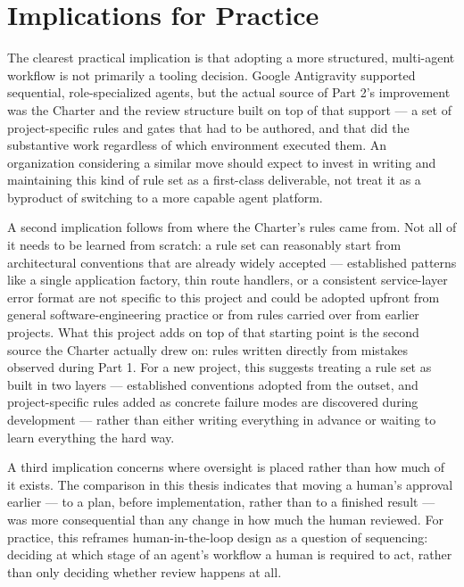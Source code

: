 \section{Implications for Practice}

The clearest practical implication is that adopting a more structured, multi-agent workflow is not primarily a tooling decision. Google Antigravity supported sequential, role-specialized agents, but the actual source of Part 2's improvement was the Charter and the review structure built on top of that support --- a set of project-specific rules and gates that had to be authored, and that did the substantive work regardless of which environment executed them. An organization considering a similar move should expect to invest in writing and maintaining this kind of rule set as a first-class deliverable, not treat it as a byproduct of switching to a more capable agent platform.

A second implication follows from where the Charter's rules came from. Not all of it needs to be learned from scratch: a rule set can reasonably start from architectural conventions that are already widely accepted --- established patterns like a single application factory, thin route handlers, or a consistent service-layer error format are not specific to this project and could be adopted upfront from general software-engineering practice or from rules carried over from earlier projects. What this project adds on top of that starting point is the second source the Charter actually drew on: rules written directly from mistakes observed during Part 1. For a new project, this suggests treating a rule set as built in two layers --- established conventions adopted from the outset, and project-specific rules added as concrete failure modes are discovered during development --- rather than either writing everything in advance or waiting to learn everything the hard way.

A third implication concerns where oversight is placed rather than how much of it exists. The comparison in this thesis indicates that moving a human's approval earlier --- to a plan, before implementation, rather than to a finished result --- was more consequential than any change in how much the human reviewed. For practice, this reframes human-in-the-loop design as a question of sequencing: deciding at which stage of an agent's workflow a human is required to act, rather than only deciding whether review happens at all.

